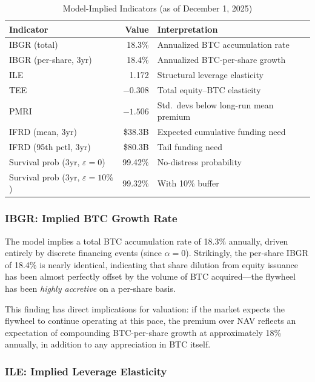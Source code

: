 \begin{table}[H]
\centering
\caption{Model-Implied Indicators (as of December 1, 2025)}
\label{tab:indicators}
\begin{tabular}{@{}lrl@{}}
\toprule
\textbf{Indicator} & \textbf{Value} & \textbf{Interpretation} \\
\midrule
IBGR (total) & 18.3\% & Annualized BTC accumulation rate \\
IBGR (per-share, 3yr) & 18.4\% & Annualized BTC-per-share growth \\
ILE & 1.172 & Structural leverage elasticity \\
TEE & $-0.308$ & Total equity--BTC elasticity \\
PMRI & $-1.506$ & Std.~devs below long-run mean premium \\
IFRD (mean, 3yr) & \$38.3B & Expected cumulative funding need \\
IFRD (95th pctl, 3yr) & \$80.3B & Tail funding need \\
Survival prob (3yr, $\varepsilon=0$) & 99.42\% & No-distress probability \\
Survival prob (3yr, $\varepsilon=10\%$) & 99.32\% & With 10\% buffer \\
\bottomrule
\end{tabular}
\end{table}

\subsubsection{IBGR: Implied BTC Growth Rate}

The model implies a total BTC accumulation rate of 18.3\% annually, driven entirely by discrete financing events (since $\alpha = 0$). Strikingly, the per-share IBGR of 18.4\% is nearly identical, indicating that share dilution from equity issuance has been almost perfectly offset by the volume of BTC acquired---the flywheel has been \emph{highly accretive} on a per-share basis.

This finding has direct implications for valuation: if the market expects the flywheel to continue operating at this pace, the premium over NAV reflects an expectation of compounding BTC-per-share growth at approximately 18\% annually, in addition to any appreciation in BTC itself.

\subsubsection{ILE: Implied Leverage Elasticity}

